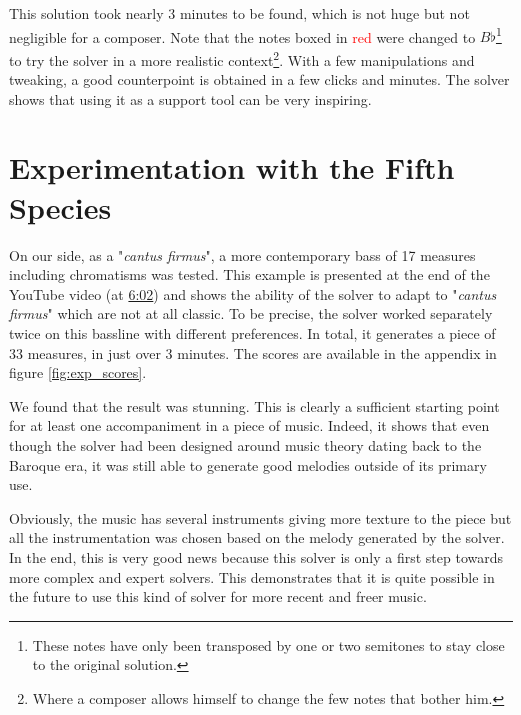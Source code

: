 This solution took nearly 3 minutes to be found, which is not huge but not negligible for a composer. Note that the notes boxed in \textcolor{red}{red} were changed to $B\flat$\footnote{These notes have only been transposed by one or two semitones to stay close to the original solution.} to try the solver in a more realistic context\footnote{Where a composer allows himself to change the few notes that bother him.}. With a few manipulations and tweaking, a good counterpoint is obtained in a few clicks and minutes. The solver shows that using it as a support tool can be very inspiring.

\section{Experimentation with the Fifth Species}\label{sec:5sp_experimentation}
On our side, as a "\textit{cantus firmus}", a more contemporary bass of 17 measures including chromatisms was tested. This example is presented at the end of the YouTube video\parencite{EvalYT} (at \href{https://youtu.be/9yB4OGr4Cgk?t=362}{6:02}) and shows the ability of the solver to adapt to "\textit{cantus firmus}" which are not at all classic. To be precise, the solver worked separately twice on this bassline with different preferences. In total, it generates a piece of 33 measures, in just over 3 minutes. The scores are available in the appendix in figure \ref{fig:exp_scores}.

We found that the result was stunning. This is clearly a sufficient starting point for at least one accompaniment in a piece of music. Indeed, it shows that even though the solver had been designed around music theory dating back to the Baroque era, it was still able to generate good melodies outside of its primary use.

Obviously, the music has several instruments giving more texture to the piece but all the instrumentation was chosen based on the melody generated by the solver. In the end, this is very good news because this solver is only a first step towards more complex and expert solvers. This demonstrates that it is quite possible in the future to use this kind of solver for more recent and freer music.